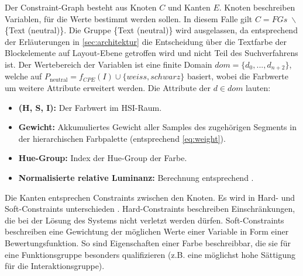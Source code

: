 Der Constraint-Graph besteht aus Knoten $C$ und Kanten $E$. Knoten beschreiben Variablen, für die Werte bestimmt werden sollen. In diesem Falle gilt $C = FGs\; \backslash$ \{Text (neutral)\}. Die Gruppe \{Text (neutral)\} wird ausgelassen, da entsprechend der Erläuterungen in \autoref{sec:architektur} die Entscheidung über die Textfarbe der Blockelemente auf Layout-Ebene  getroffen wird und nicht Teil des Suchverfahrens ist. Der Wertebereich der Variablen ist eine finite Domain $dom = \{d_0, ..., d_{n+2}\}$, welche auf $P_\text{neutral} = f_{CPE}(I) \cup \{weiss, schwarz\}$ basiert, wobei die Farbwerte um weitere Attribute erweitert werden. Die Attribute der $d \in dom$ lauten:

\begin{itemize}
	\item \textbf{(H, S, I):} Der Farbwert im HSI-Raum.
	\item \textbf{Gewicht:} Akkumuliertes Gewicht aller Samples des zugehörigen Segments in der hierarchischen Farbpalette (entsprechend \autoref{eq:weight}).
	\item \textbf{Hue-Group:} Index der Hue-Group der Farbe.
	\item \textbf{Normalisierte relative Luminanz:} Berechnung entsprechend \citep{wcag-rel-luminance}.
\end{itemize}

Die Kanten entsprechen Constraints zwischen den Knoten. Es wird in Hard- und Soft-Constraints unterschieden \citep{patterns}. Hard-Constraints beschreiben Einschränkungen, die bei der Lösung des Systems nicht verletzt werden dürfen. Soft-Constraints beschreiben eine Gewichtung der möglichen Werte einer Variable in Form einer Bewertungsfunktion. So sind Eigenschaften einer Farbe beschreibbar, die sie für eine Funktionsgruppe besonders qualifizieren (z.B. eine möglichst hohe Sättigung für die Interaktionsgruppe).


